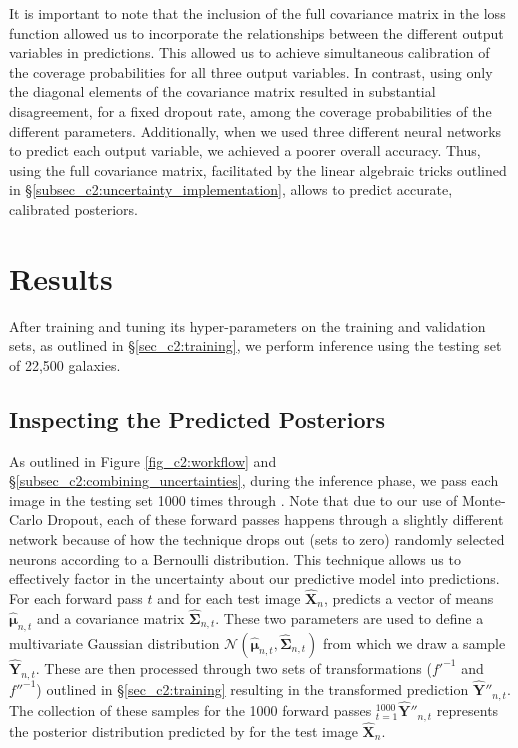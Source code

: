 It is important to note that the inclusion of the full covariance matrix in the loss function allowed us to incorporate the relationships between the different output variables in \gampen{} predictions. This allowed us to achieve simultaneous calibration of the coverage probabilities for all three output variables. 
In contrast, using only the diagonal elements of the covariance matrix resulted in substantial disagreement, for a fixed dropout rate, among the coverage probabilities of the different parameters.
Additionally, when we used three different neural networks to predict each output variable, we achieved a poorer overall accuracy. Thus, using the full covariance matrix, facilitated by the linear algebraic tricks outlined in \S \ref{subsec_c2:uncertainty_implementation}, allows \gampen{} to predict accurate, calibrated posteriors.

\section{Results} \label{sec_c2:results}
After training \gampen{} and tuning its hyper-parameters on the training and validation sets, as outlined in \S \ref{sec_c2:training}, we perform inference using the testing set of 22,500 galaxies. 

\subsection{Inspecting the Predicted Posteriors} \label{subsec_c2:predicted_dists}

As outlined in Figure \ref{fig_c2:workflow} and \S \ref{subsec_c2:combining_uncertainties}, during the inference phase, we pass each image in the testing set 1000 times through \gampen{}. Note that due to our use of Monte-Carlo Dropout, each of these forward passes happens through a slightly different network because of how the technique drops out (sets to zero) randomly selected neurons according to a Bernoulli distribution. This technique allows us to effectively factor in the uncertainty about our predictive model into \gampen{} predictions. For each forward pass $t$ and for each test image $\boldsymbol{\hat{X}}_n$, \gampen{} predicts a vector of means $\boldsymbol{\hat{\mu}}_{n,t}$ and a covariance matrix $\boldsymbol{\hat{\Sigma}}_{n,t}$. These two parameters are used to define a multivariate Gaussian distribution $\mathcal{N}(\boldsymbol{\hat{\mu}}_{n,t},\boldsymbol{\hat{\Sigma}}_{n,t})$ from which we draw a sample $\boldsymbol{\hat{Y}}_{n,t}$. These are then processed through two sets of transformations ($f'^{-1}$ and $f''^{-1}$) outlined in \S \ref{sec_c2:training} resulting in the transformed prediction $\boldsymbol{\hat{Y}''}_{n,t}$. The collection of these samples for the 1000 forward passes $_{t=1}^{1000}\boldsymbol{\hat{Y}''}_{n,t}$ represents the posterior distribution predicted by \gampen{} for the test image $\boldsymbol{\hat{X}}_{n}$.

